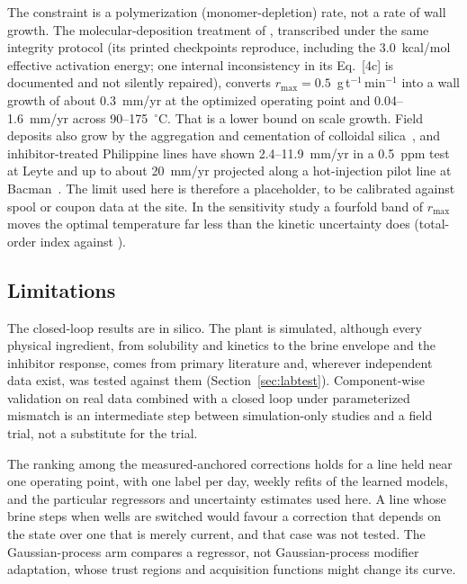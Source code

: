 The constraint is a polymerization (monomer-depletion) rate, not a rate
of wall growth. The molecular-deposition treatment of
\citet{weres1981kinetics}, transcribed under the same integrity protocol
(its printed checkpoints reproduce, including the 3.0~kcal/mol effective
activation energy; one internal inconsistency in its Eq.~[4c] is
documented and not silently repaired), converts
$r_{\max} = 0.5$~g\,t$^{-1}$\,min$^{-1}$ into a wall growth of about
0.3~mm/yr at the optimized operating point and 0.04--1.6~mm/yr across
90--175~$^{\circ}$C. That is a lower bound on scale growth. Field
deposits also grow by the aggregation and cementation of colloidal
silica~\citep{vandenheuvel2018understanding}, and inhibitor-treated
Philippine lines have shown 2.4--11.9~mm/yr in a 0.5~ppm test at Leyte
and up to about 20~mm/yr projected along a hot-injection pilot line at
Bacman~\citep{baltazar2014grc,see2010wgc}. The limit used here is
therefore a placeholder, to be calibrated against spool or coupon data
at the site. In the sensitivity study a fourfold band of $r_{\max}$
moves the optimal temperature far less than the kinetic uncertainty
does (total-order index  against ).

\subsection{Limitations}\label{sec:limits}

The closed-loop results are in silico. The plant is simulated, although
every physical ingredient, from solubility and kinetics to the brine
envelope and the inhibitor response, comes from primary literature and,
wherever independent data exist, was tested against them
(Section~\ref{sec:labtest}). Component-wise validation on real data
combined with a closed loop under parameterized mismatch is an
intermediate step between simulation-only studies and a field trial,
not a substitute for the trial.

The ranking among the measured-anchored corrections holds for a line
held near one operating point, with one label per day, weekly refits of
the learned models, and the particular regressors and uncertainty
estimates used here. A line whose brine steps when wells are switched
would favour a correction that depends on the state over one that is
merely current, and that case was not tested. The Gaussian-process arm
compares a regressor, not Gaussian-process modifier adaptation, whose
trust regions and acquisition functions might change its curve.

